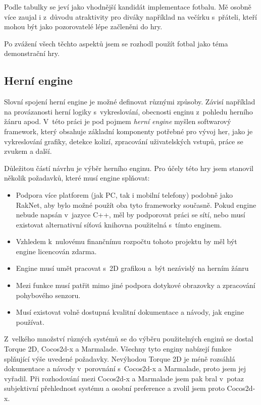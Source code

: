 \documentclass[thesis=B,czech,hidelinks]{FITthesis}[2012/06/26] %
\begin{document}
Podle tabulky se jeví jako vhodnější kandidát implementace fotbalu. Mě osobně více zaujal i z~důvodu atraktivity pro diváky například na večírku s~přáteli, kteří mohou být jako pozorovatelé lépe začleněni do hry. 

Po zvážení všech těchto aspektů jsem se rozhodl použít fotbal jako téma demonstrační hry.

\subsection{Herní engine}

Slovní spojení herní engine je možné definovat různými způsoby. Závisí například na provázanosti herní logiky s~vykreslování, obecnosti enginu z~pohledu herního žánru apod. V~této práci je pod pojmem \textit{herní engine} myšlen softwarový framework, který obsahuje základní komponenty potřebné pro vývoj her, jako je vykreslování grafiky, detekce kolizí, zpracování uživatelských vstupů, práce se zvukem a další. \cite{gameengine}

Důležitou částí návrhu je výběr herního enginu. Pro účely této hry jsem stanovil několik požadavků, které musí engine splňovat:

\begin{itemize}
	\item Podpora více platforem (jak PC, tak i mobilní telefony) podobně jako RakNet, aby bylo možné použít oba tyto frameworky současně. Pokud engine nebude napsán v~jazyce C++, měl by podporovat práci se sítí, nebo musí existovat alternativní síťová knihovna použitelná s~tímto enginem.
	\item Vzhledem k~nulovému finančnímu rozpočtu tohoto projektu by měl být engine licencován zdarma.
	\item Engine musí umět pracovat s~2D grafikou a~být nezávislý na herním žánru
	\item Mezi funkce musí patřit mimo jiné podpora dotykové obrazovky a zpracování pohybového senzoru.
	\item Musí existovat volně dostupná kvalitní dokumentace a návody, jak engine používat.
\end{itemize}

Z~velkého množství různých systémů se do výběru použitelných enginů se dostal Torque 2D, Cocos2d-x a Marmalade. Všechny tyto enginy nabízejí funkce splňující výše uvedené požadavky. Nevýhodou Torque 2D je méně rozsáhlá dokumentace a návody v~porovnání s~Cocos2d-x a Marmalade, proto jsem jej vyřadil. Při rozhodování mezi Cocos2d-x a Marmalade jsem pak bral v~potaz subjektivní přehlednost systému a osobní preference a zvolil jsem proto Cocos2d-x.
\end{document}
